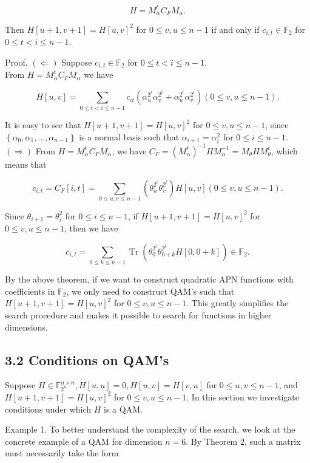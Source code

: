 \documentclass[10pt]{article}
\begin{document}
$$
H=M_{\alpha}^{t} C_{F} M_{\alpha} .
$$

Then $H[u+1, v+1]=H[u, v]^{2}$ for $0 \leq v, u \leq n-1$ if and only if $c_{i, t} \in \mathbb{F}_{2}$ for $0 \leq t<i \leq n-1$.

Proof. $(\Leftarrow)$ Suppose $c_{i, t} \in \mathbb{F}_{2}$ for $0 \leq t<i \leq n-1$.\\
From $H=M_{\alpha}^{t} C_{F} M_{\alpha}$ we have

$$
H[u, v]=\sum_{0 \leq t<i \leq n-1} c_{i t}\left(\alpha_{u}^{2^{i}} \alpha_{v}^{2^{t}}+\alpha_{u}^{2^{t}} \alpha_{v}^{2^{i}}\right)(0 \leq v, u \leq n-1) .
$$

It is easy to see that $H[u+1, v+1]=H[u, v]^{2}$ for $0 \leq v, u \leq n-1$, since $\left\{\alpha_{0}, \alpha_{1}, \ldots, \alpha_{n-1}\right\}$ is a normal basis such that $\alpha_{i+1}=\alpha_{i}^{2}$ for $0 \leq i \leq n-1$.\\
$(\Rightarrow)$ From $H=M_{\alpha}^{t} C_{F} M_{\alpha}$, we have $C_{F}=\left(M_{\alpha}^{t}\right)^{-1} H M_{\alpha}^{-1}=M_{\theta} H M_{\theta}^{t}$, which means that

$$
c_{i, t}=C_{F}[i, t]=\sum_{0 \leq u, v \leq n-1}\left(\theta_{u}^{2^{i}} \theta_{v}^{2^{t}}\right) H[u, v](0 \leq v, u \leq n-1) .
$$

Since $\theta_{i+1}=\theta_{i}^{2}$ for $0 \leq i \leq n-1$, if $H[u+1, v+1]=H[u, v]^{2}$ for $0 \leq v, u \leq n-1$, then we have

$$
c_{i, t}=\sum_{0 \leq k \leq n-1} \operatorname{Tr}\left(\theta_{0}^{2^{i}} \theta_{0+k}^{2^{t}} H[0,0+k]\right) \in \mathbb{F}_{2} .
$$

By the above theorem, if we want to construct quadratic APN functions with coefficients in $\mathbb{F}_{2}$, we only need to construct QAM's such that $H[u+1, v+1]= H[u, v]^{2}$ for $0 \leq v, u \leq n-1$. This greatly simplifies the search procedure and makes it possible to search for functions in higher dimensions.

\subsection*{3.2 Conditions on QAM's}
Suppose $H \in \mathbb{F}_{2^{n}}^{n \times n}, H[u, u]=0, H[u, v]=H[v, u]$ for $0 \leq u, v \leq n-1$, and $H[u+1, v+1]=H[u, v]^{2}$ for $0 \leq v, u \leq n-1$. In this section we investigate conditions under which $H$ is a QAM.

Example 1. To better understand the complexity of the search, we look at the concrete example of a QAM for dimension $n=6$. By Theorem 2, such a matrix must necessarily take the form
\end{document}
